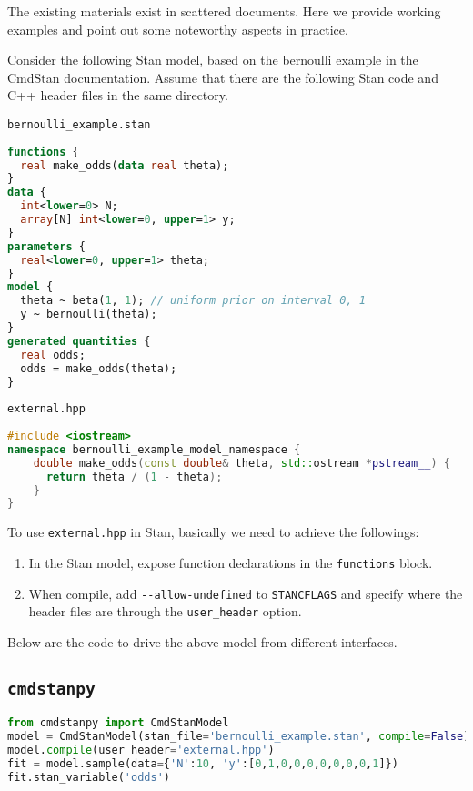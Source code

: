 \documentclass[11pt]{article}
\begin{document}
The existing materials exist in scattered documents. Here we provide working examples and point out some noteworthy aspects in practice. 

Consider the following Stan model, based on the \href{https://mc-stan.org/docs/cmdstan-guide/using-external-cpp-code.html}{bernoulli example} in the CmdStan documentation. Assume that there are the following Stan code and C++ header files in the same directory. 

\verb|bernoulli_example.stan|
\begin{lstlisting}[language=Stan, style=lgeneral]
functions {
  real make_odds(data real theta);
}
data {
  int<lower=0> N;
  array[N] int<lower=0, upper=1> y;
}
parameters {
  real<lower=0, upper=1> theta;
}
model {
  theta ~ beta(1, 1); // uniform prior on interval 0, 1
  y ~ bernoulli(theta);
}
generated quantities {
  real odds;
  odds = make_odds(theta);
}
\end{lstlisting}

\verb|external.hpp|
\begin{lstlisting}[language=c++, style=lgeneral]
#include <iostream>
namespace bernoulli_example_model_namespace {
	double make_odds(const double& theta, std::ostream *pstream__) {
	  return theta / (1 - theta);
	}
}
\end{lstlisting}


To use \verb|external.hpp| in Stan, basically we need to achieve the followings:

\begin{enumerate}
	\item In the Stan model, expose function declarations in the \verb|functions| block. 
	\item When compile, add \verb|--allow-undefined| to \verb|STANCFLAGS| and specify where the header files are through the \verb|user_header| option. 
\end{enumerate}

Below are the code to drive the above model from different interfaces.


\cprotect\subsection{\verb|cmdstanpy|}
\begin{lstlisting}[language=py, style=lgeneral]
from cmdstanpy import CmdStanModel
model = CmdStanModel(stan_file='bernoulli_example.stan', compile=False)
model.compile(user_header='external.hpp')
fit = model.sample(data={'N':10, 'y':[0,1,0,0,0,0,0,0,0,1]})
fit.stan_variable('odds')
\end{lstlisting}
\end{document}
